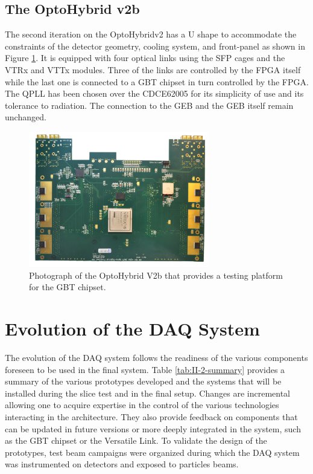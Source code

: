     \subsection{The OptoHybrid v2b}

      The second iteration on the OptoHybridv2 has a U shape to accommodate the constraints of the detector geometry, cooling system, and front-panel as shown in Figure \ref{fig:II-2-ohv2b}. It is equipped with four optical links using the SFP cages and the VTRx and VTTx modules. Three of the links are controlled by the FPGA itself while the last one is connected to a GBT chipset in turn controlled by the FPGA. The QPLL has been chosen over the CDCE62005 for its simplicity of use and its tolerance to radiation. The connection to the GEB and the GEB itself remain unchanged.

      \begin{figure}[t!]
        \centering
        \includegraphics[width=0.7\textwidth]{img/II-2-daq/oh-v2b.jpg}
        \caption{Photograph of the OptoHybrid V2b that provides a testing platform for the GBT chipset.}
        \label{fig:II-2-ohv2b}
      \end{figure}

  \section{Evolution of the DAQ System}

    The evolution of the DAQ system follows the readiness of the various components foreseen to be used in the final system. Table \ref{tab:II-2-summary} provides a summary of the various prototypes developed and the systems that will be installed during the slice test and in the final setup. Changes are incremental allowing one to acquire expertise in the control of the various technologies interacting in the architecture. They also provide feedback on components that can be updated in future versions or more deeply integrated in the system, such as the GBT chipset or the Versatile Link. To validate the design of the prototypes, test beam campaigns were organized during which the DAQ system was instrumented on detectors and exposed to particles beams.

